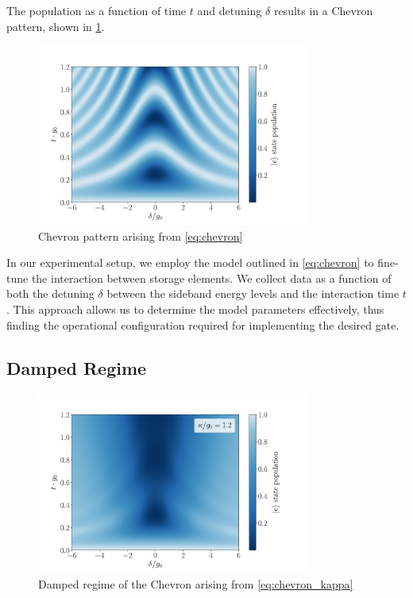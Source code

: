 The population as a function of time $t$ and detuning $\delta$ results in a Chevron pattern, shown in \cref{fig:Chevron}.

\begin{figure}
    \centering
    \includegraphics[width = 0.8\textwidth]{Images/Chap3/Chevron.pdf}
    \caption{Chevron pattern arising from \cref{eq:chevron}}
    \label{fig:Chevron}
\end{figure}

In our experimental setup, we employ the model outlined in \cref{eq:chevron} to fine-tune the interaction between storage elements. 
We collect data as a function of both the detuning $\delta$ between the sideband energy levels and the interaction time $t$. 
This approach allows us to determine the model parameters effectively, thus finding the operational configuration required for implementing the desired gate.

\subsection{Damped Regime}

\begin{figure}
    \centering
    \includegraphics[width = 0.8\textwidth]{Images/Chap3/Chevron_kappa.pdf}
    \caption{Damped regime of the Chevron arising from \cref{eq:chevron_kappa}}
    \label{fig:chevron_kappa}
\end{figure}

